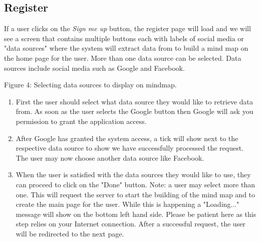 \documentclass[hidelinks,english]{article}
\begin{document}
    \subsection{Register}
        If a user clicks on the \textit{Sign me up} button, the register page will load and we will see a screen that contains multiple buttons each with labels of social media or "data sources" where the system will extract data from to build a mind map on the home page for the user. More than one data source can be selected. Data sources include social media such as Google and Facebook.
        \begin{center}
          Figure 4: Selecting data sources to display on mindmap.
          \label{Select Data}
        \end{center}

        \begin{enumerate}  
            \item First the user should select what data source they would like to retrieve data from. As soon as the user selects the Google button then Google will ask you permission to grant the application access.
            \item After Google has granted the system access, a tick will show next to the respective data source to show we have successfully processed the request. The user may now choose another data source like Facebook.
            \item When the user is satisfied with the data sources they would like to use, they can proceed to click on the "Done" button. Note: a user may select more than one. This will request the server to start the building of the mind map and to create the main page for the user. While this is happening a "Loading..." message will show on the bottom left hand side. Please be patient here as this step relies on your Internet connection. After a successful request, the user will be redirected to the next page.
        \end{enumerate}
\end{document}
